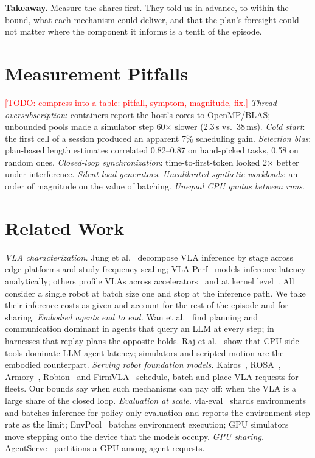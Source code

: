 \documentclass[conference,10pt]{IEEEtran}
\newcommand{\pct}[1]{#1\%}
\newcommand{\todo}[1]{\textcolor{red}{[TODO: #1]}}
\begin{document}
\textbf{Takeaway.} Measure the shares first. They told us in advance, to within the bound,
what each mechanism could deliver, and that the plan's foresight could not matter where the
component it informs is a tenth of the episode.

\section{Measurement Pitfalls}\label{sec:pitfalls}

\todo{compress into a table: pitfall, symptom, magnitude, fix.}
\emph{Thread oversubscription}: containers report the host's cores to OpenMP/BLAS; unbounded
pools made a simulator step 60$\times$ slower (2.3\,s vs.\ 38\,ms). \emph{Cold start}: the
first cell of a session produced an apparent \pct{7} scheduling gain. \emph{Selection bias}:
plan-based length estimates correlated 0.82--0.87 on hand-picked tasks, 0.58 on random ones.
\emph{Closed-loop synchronization}: time-to-first-token looked 2$\times$ better under
interference. \emph{Silent load generators}. \emph{Uncalibrated synthetic workloads}: an
order of magnitude on the value of batching. \emph{Unequal CPU quotas between runs}.

\section{Related Work}

\emph{VLA characterization.} Jung et al.~\cite{jung2027beyond} decompose VLA inference by
stage across edge platforms and study frequency scaling; VLA-Perf~\cite{vlaperf} models
inference latency analytically; others profile VLAs across accelerators~\cite{zhou2026xpu}
and at kernel level~\cite{kercolle}. All consider a single robot at batch size one and stop
at the inference path. We take their inference costs as given and account for the rest of
the episode and for sharing.
\emph{Embodied agents end to end.} Wan et al.~\cite{wan2025ispass} find planning and
communication dominant in agents that query an LLM at every step; in harnesses that replay
plans the opposite holds. Raj et al.~\cite{raj2025cpu} show that CPU-side tools dominate
LLM-agent latency; simulators and scripted motion are the embodied counterpart.
\emph{Serving robot foundation models.} Kairos~\cite{kairos}, ROSA~\cite{rosa},
Armory~\cite{armory}, Robion~\cite{robion} and FirmVLA~\cite{firmvla} schedule, batch and
place VLA requests for fleets. Our bounds say when such mechanisms can pay off: when the
VLA is a large share of the closed loop.
\emph{Evaluation at scale.} vla-eval~\cite{vlaeval} shards environments and batches
inference for policy-only evaluation and reports the environment step rate as the limit;
EnvPool~\cite{envpool} batches environment execution; GPU simulators~\cite{gpusimbench}
move stepping onto the device that the models occupy.
\emph{GPU sharing.} AgentServe~\cite{agentserve} partitions a GPU among agent requests.
\end{document}

